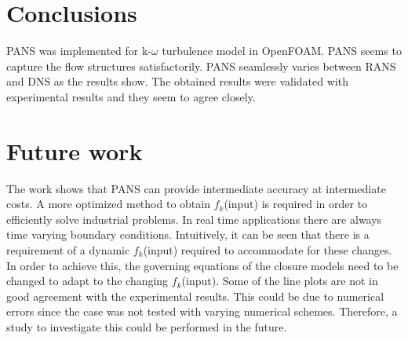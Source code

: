 \section{Conclusions}
PANS was implemented for k-$\omega$ turbulence model in OpenFOAM. PANS seems to capture the flow structures satisfactorily. PANS seamlessly varies between RANS and DNS as the results show. The obtained results were validated with experimental results and they seem to agree closely. 


\section{Future work}
The work shows that PANS can provide intermediate accuracy at intermediate costs. A more optimized method to obtain $f_k$(input) is required in order to efficiently solve industrial problems. In real time applications there are always time varying boundary conditions. Intuitively, it can be seen that there is a requirement of a dynamic $f_k$(input) required to accommodate for these changes. In order to achieve this, the governing equations of the closure models need to be changed to adapt to the changing $f_k$(input). Some of the line plots are not in good agreement with the experimental results. This could be due to numerical errors since the case was not tested with varying numerical schemes. Therefore, a study to investigate this could be performed in the future. 





































